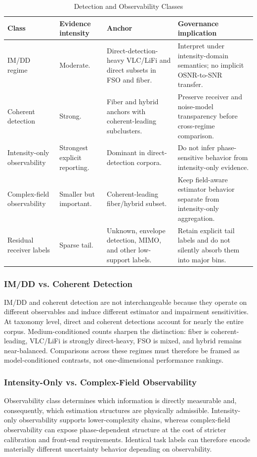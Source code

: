 \begin{table}[!t]
\caption{Detection and Observability Classes}
\label{tab:detection-classes}
\centering
\footnotesize
\setlength{\tabcolsep}{4pt}
\begin{tabularx}{\textwidth}{p{}p{}p{}X}
\toprule
\textbf{Class} & \textbf{Evidence intensity} & \textbf{Anchor} & \textbf{Governance implication} \\
\midrule
IM/DD regime & Moderate. & Direct-detection-heavy VLC/LiFi and direct subsets in FSO and fiber. & Interpret under intensity-domain semantics; no implicit OSNR-to-SNR transfer. \\
Coherent detection & Strong. & Fiber and hybrid anchors with coherent-leading subclusters. & Preserve receiver and noise-model transparency before cross-regime comparison. \\
Intensity-only observability & Strongest explicit reporting. & Dominant in direct-detection corpora. & Do not infer phase-sensitive behavior from intensity-only evidence. \\
Complex-field observability & Smaller but important. & Coherent-leading fiber/hybrid subset. & Keep field-aware estimator behavior separate from intensity-only aggregation. \\
Residual receiver labels & Sparse tail. & Unknown, envelope detection, MIMO, and other low-support labels. & Retain explicit tail labels and do not silently absorb them into major bins. \\
\bottomrule
\end{tabularx}
\end{table}

\subsubsection{IM/DD vs. Coherent Detection}
IM/DD and coherent detection are not interchangeable because they operate on different observables and induce different estimator and impairment sensitivities. At taxonomy level, direct and coherent detections account for nearly the entire corpus. Medium-conditioned counts sharpen the distinction: fiber is coherent-leading, VLC/LiFi is strongly direct-heavy, FSO is mixed, and hybrid remains near-balanced. Comparisons across these regimes must therefore be framed as model-conditioned contrasts, not one-dimensional performance rankings.

\subsubsection{Intensity-Only vs. Complex-Field Observability}
Observability class determines which information is directly measurable and, consequently, which estimation structures are physically admissible. Intensity-only observability supports lower-complexity chains, whereas complex-field observability can expose phase-dependent structure at the cost of stricter calibration and front-end requirements. Identical task labels can therefore encode materially different uncertainty behavior depending on observability.

